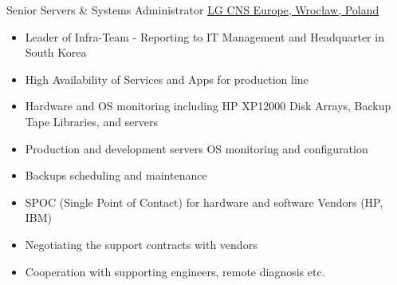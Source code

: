 \documentclass[letterpaper]{tenseconds} %
\begin{document}
\begin{twenty}
        {Senior Servers \& Systems Administrator}
        {\href{https://www.lgcns.com}{LG CNS Europe, Wrocław, Poland}}
        {}
        {
        {\begin{itemize}
        \item Leader of Infra-Team - Reporting to IT Management and Headquarter in South Korea
        \item High Availability of Services and Apps for production line
        \item Hardware and OS monitoring including HP XP12000 Disk Arrays, Backup Tape Libraries, and servers
        \item Production and development servers OS monitoring and configuration
        \item Backups scheduling and maintenance
        \item SPOC (Single Point of Contact) for hardware and software Vendors (HP, IBM)
        \item Negotiating the support contracts with vendors
        \item Cooperation with supporting engineers, remote diagnosis etc.
        \end{itemize}}
        }
%        
 

        
\end{twenty}
\end{document}
